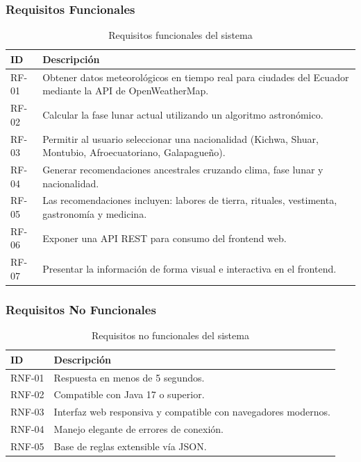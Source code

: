 \documentclass[conference]{IEEEtran}
\begin{document}
\subsubsection{Requisitos Funcionales}

\begin{table}[H]
    \centering
    \caption{Requisitos funcionales del sistema}
    \label{tab:req_funcionales}
    \footnotesize
    \begin{tabularx}{\columnwidth}{|l|X|}
        \hline
        \textbf{ID} & \textbf{Descripción} \\
        \hline
        RF-01 & Obtener datos meteorológicos en tiempo real para ciudades del Ecuador mediante la API de OpenWeatherMap. \\
        \hline
        RF-02 & Calcular la fase lunar actual utilizando un algoritmo astronómico. \\
        \hline
        RF-03 & Permitir al usuario seleccionar una nacionalidad (Kichwa, Shuar, Montubio, Afroecuatoriano, Galapagueño). \\
        \hline
        RF-04 & Generar recomendaciones ancestrales cruzando clima, fase lunar y nacionalidad. \\
        \hline
        RF-05 & Las recomendaciones incluyen: labores de tierra, rituales, vestimenta, gastronomía y medicina. \\
        \hline
        RF-06 & Exponer una API REST para consumo del frontend web. \\
        \hline
        RF-07 & Presentar la información de forma visual e interactiva en el frontend. \\
        \hline
    \end{tabularx}
\end{table}

\subsubsection{Requisitos No Funcionales}

\begin{table}[H]
    \centering
    \caption{Requisitos no funcionales del sistema}
    \label{tab:req_no_funcionales}
    \footnotesize
    \begin{tabularx}{\columnwidth}{|l|X|}
        \hline
        \textbf{ID} & \textbf{Descripción} \\
        \hline
        RNF-01 & Respuesta en menos de 5 segundos. \\
        \hline
        RNF-02 & Compatible con Java 17 o superior. \\
        \hline
        RNF-03 & Interfaz web responsiva y compatible con navegadores modernos. \\
        \hline
        RNF-04 & Manejo elegante de errores de conexión. \\
        \hline
        RNF-05 & Base de reglas extensible vía JSON. \\
        \hline
    \end{tabularx}
\end{table}
\end{document}
